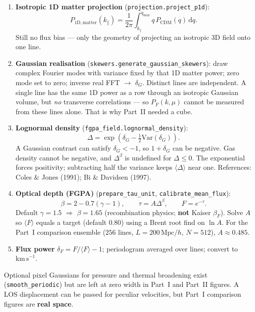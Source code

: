 \documentclass[11pt]{article}
\begin{document}
\begin{enumerate}
\item \textbf{Isotropic 1D matter projection}
(\texttt{projection.project\_p1d}):
\[
P_{1\mathrm{D,matter}}(k_\parallel)
=
\frac{1}{2\pi}\int_{k_\parallel}^{q_\mathrm{max}} q\,P_\mathrm{CDM}(q)\,\mathrm{d}q.
\]
Still no flux bias --- only the geometry of projecting an isotropic 3D field onto one line.

\item \textbf{Gaussian realisation}
(\texttt{skewers.generate\_gaussian\_skewers}):
draw complex Fourier modes with variance fixed by that 1D matter power; zero mode set to zero; inverse real FFT $\to$ $\delta_G$.
Distinct lines are independent.
A single line has the same 1D power as a row through an isotropic Gaussian volume, but \emph{no} transverse correlations --- so $P_F(k,\mu)$ cannot be measured from these lines alone.
That is why Part~II needed a cube.

\item \textbf{Lognormal density}
(\texttt{fgpa\_field.lognormal\_density}):
\[
\Delta=\exp\!\left(\delta_G-\tfrac12\mathrm{Var}(\delta_G)\right).
\]
A Gaussian contrast can satisfy $\delta_G<-1$, so $1+\delta_G$ can be negative.
Gas density cannot be negative, and $\Delta^{\beta}$ is undefined for $\Delta\le 0$.
The exponential forces positivity; subtracting half the variance keeps $\langle\Delta\rangle$ near one.
References: Coles \& Jones (1991); Bi \& Davidsen (1997).

\item \textbf{Optical depth (FGPA)}
(\texttt{prepare\_tau\_unit}, \texttt{calibrate\_mean\_flux}):
\[
\beta=2-0.7(\gamma-1),\qquad
\tau=A\Delta^{\beta},\qquad
F=e^{-\tau}.
\]
Default $\gamma=1.5$ $\Rightarrow$ $\beta=1.65$ (recombination physics; \textbf{not} Kaiser $\beta_F$).
Solve $A$ so $\langle F\rangle$ equals a target (default $0.80$) using a Brent root find on $\ln A$.
For the Part~I comparison ensemble ($256$ lines, $L=200\,\mathrm{Mpc}/h$, $N=512$), $A\approx 0.485$.

\item \textbf{Flux power}
$\delta_F=F/\langle F\rangle-1$; periodogram averaged over lines; convert to $\mathrm{km\,s}^{-1}$.
\end{enumerate}

Optional pixel Gaussians for pressure and thermal broadening exist (\texttt{smooth\_periodic}) but are left at zero width in Part~I and Part~II figures.
A LOS displacement can be passed for peculiar velocities, but Part~I comparison figures are \textbf{real space}.
\end{document}
